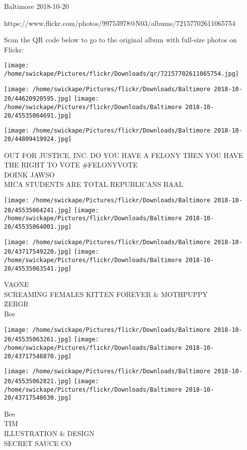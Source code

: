 \documentclass[10pt,letterpaper]{article}
\begin{document}
Baltimore 2018-10-20

https://www.flickr.com/photos/99753978@N03/albums/72157702611065754

Scan the QR code below to go to the original album with full-size photos on Flickr:

\texttt{[image: /home/swickape/Pictures/flickr/Downloads/qr/72157702611065754.jpg]}
\pagebreak

\texttt{[image: /home/swickape/Pictures/flickr/Downloads/Baltimore 2018-10-20/44620920595.jpg]}
\texttt{[image: /home/swickape/Pictures/flickr/Downloads/Baltimore 2018-10-20/45535064691.jpg]}

\vspace{0.25in}
\texttt{[image: /home/swickape/Pictures/flickr/Downloads/Baltimore 2018-10-20/44809419924.jpg]}

OUT FOR JUSTICE, INC. DO YOU HAVE A FELONY THEN YOU HAVE THE RIGHT TO VOTE \#FELONYVOTE\\
DOINK JAWSO\\
MICA STUDENTS ARE TOTAL REPUBLICANS BAAL
\pagebreak

\texttt{[image: /home/swickape/Pictures/flickr/Downloads/Baltimore 2018-10-20/45535064241.jpg]}
\texttt{[image: /home/swickape/Pictures/flickr/Downloads/Baltimore 2018-10-20/45535064001.jpg]}

\texttt{[image: /home/swickape/Pictures/flickr/Downloads/Baltimore 2018-10-20/43717549220.jpg]}
\texttt{[image: /home/swickape/Pictures/flickr/Downloads/Baltimore 2018-10-20/45535063541.jpg]}

VAONE\\
SCREAMING FEMALES KITTEN FOREVER \& MOTHPUPPY\\
ZERGR\\
Bee
\pagebreak

\texttt{[image: /home/swickape/Pictures/flickr/Downloads/Baltimore 2018-10-20/45535063261.jpg]}
\texttt{[image: /home/swickape/Pictures/flickr/Downloads/Baltimore 2018-10-20/43717548870.jpg]}

\texttt{[image: /home/swickape/Pictures/flickr/Downloads/Baltimore 2018-10-20/45535062821.jpg]}
\texttt{[image: /home/swickape/Pictures/flickr/Downloads/Baltimore 2018-10-20/43717548630.jpg]}

Bee\\
TIM\\
ILLUSTRATION \& DESIGN\\
SECRET SAUCE CO
\pagebreak
\end{document}
